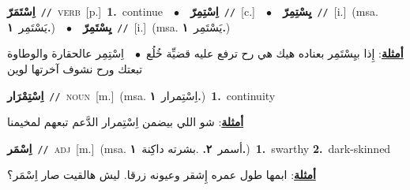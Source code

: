 \documentclass[10pt,a4paper,twoside]{article} %
\begin{document}
\begin{multicols}{2}
{\setlength\topsep{0pt}\textbf{\foreignlanguage{arabic}{اِسْتَمَرّ}}\ {\color{gray}\texttt{//}\color{black}}\ \textsc{verb}\ [p.]\ \textbf{1.}~continue\ \ $\bullet$\ \ \setlength\topsep{0pt}\textbf{\foreignlanguage{arabic}{اِسْتِمِرّ}}\ {\color{gray}\texttt{//}\color{black}}\ [c.]\ \ $\bullet$\ \ \setlength\topsep{0pt}\textbf{\foreignlanguage{arabic}{يِسْتِمِرّ}}\ {\color{gray}\texttt{//}\color{black}}\ [i.]\ \color{gray}(msa. \foreignlanguage{arabic}{يَسْتَمِر}~\foreignlanguage{arabic}{\textbf{١.}})\color{black}\ \ $\bullet$\ \ \setlength\topsep{0pt}\textbf{\foreignlanguage{arabic}{يِسْتَمِرّ}}\ {\color{gray}\texttt{//}\color{black}}\ [i.]\ \color{gray}(msa. \foreignlanguage{arabic}{يَسْتَمِر}~\foreignlanguage{arabic}{\textbf{١.}})\color{black}\  \begin{flushright}\color{gray}\foreignlanguage{arabic}{\textbf{\underline{\foreignlanguage{arabic}{أمثلة}}}: إِذا بيِسْتَمِر بعناده هيك هي رح ترفع عليه قضيِّة خُلُع\ $\bullet$\ \  اِسْتِمِر عالحقارة والوطاوة تبعتك ورح نشوف آخرتها لوين}\end{flushright}\color{black}} \vspace{2mm}

{\setlength\topsep{0pt}\textbf{\foreignlanguage{arabic}{اِسْتِمْرَار}}\ {\color{gray}\texttt{//}\color{black}}\ \textsc{noun}\ [m.]\ \color{gray}(msa. \foreignlanguage{arabic}{اِسْتِمرار}~\foreignlanguage{arabic}{\textbf{١.}})\color{black}\ \textbf{1.}~continuity\  \begin{flushright}\color{gray}\foreignlanguage{arabic}{\textbf{\underline{\foreignlanguage{arabic}{أمثلة}}}: شو اللي بيضمن اِسْتِمرار الدَّعم تبعهم لمخيمنا}\end{flushright}\color{black}} \vspace{2mm}

{\setlength\topsep{0pt}\textbf{\foreignlanguage{arabic}{اِسْمَر}}\ {\color{gray}\texttt{//}\color{black}}\ \textsc{adj}\ [m.]\ \color{gray}(msa. \foreignlanguage{arabic}{أسمر}~\foreignlanguage{arabic}{\textbf{٢.}}  .\foreignlanguage{arabic}{بشرته داكِنة}~\foreignlanguage{arabic}{\textbf{١.}})\color{black}\ \textbf{1.}~swarthy  \textbf{2.}~dark-skinned\  \begin{flushright}\color{gray}\foreignlanguage{arabic}{\textbf{\underline{\foreignlanguage{arabic}{أمثلة}}}: ابمها طول عمره إِشقر وعيونه زرقا. ليش هالقيت صار اِسْمَر؟}\end{flushright}\color{black}} \vspace{2mm}


\end{multicols}
\end{document}
